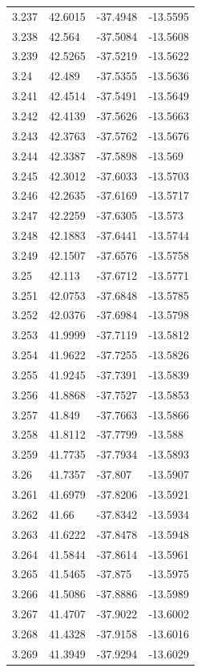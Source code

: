\begin{tabular}{llll}
3.237 & 42.6015 & -37.4948 & -13.5595 \\
3.238 & 42.564 & -37.5084 & -13.5608 \\
3.239 & 42.5265 & -37.5219 & -13.5622 \\
3.24 & 42.489 & -37.5355 & -13.5636 \\
3.241 & 42.4514 & -37.5491 & -13.5649 \\
3.242 & 42.4139 & -37.5626 & -13.5663 \\
3.243 & 42.3763 & -37.5762 & -13.5676 \\
3.244 & 42.3387 & -37.5898 & -13.569 \\
3.245 & 42.3012 & -37.6033 & -13.5703 \\
3.246 & 42.2635 & -37.6169 & -13.5717 \\
3.247 & 42.2259 & -37.6305 & -13.573 \\
3.248 & 42.1883 & -37.6441 & -13.5744 \\
3.249 & 42.1507 & -37.6576 & -13.5758 \\
3.25 & 42.113 & -37.6712 & -13.5771 \\
3.251 & 42.0753 & -37.6848 & -13.5785 \\
3.252 & 42.0376 & -37.6984 & -13.5798 \\
3.253 & 41.9999 & -37.7119 & -13.5812 \\
3.254 & 41.9622 & -37.7255 & -13.5826 \\
3.255 & 41.9245 & -37.7391 & -13.5839 \\
3.256 & 41.8868 & -37.7527 & -13.5853 \\
3.257 & 41.849 & -37.7663 & -13.5866 \\
3.258 & 41.8112 & -37.7799 & -13.588 \\
3.259 & 41.7735 & -37.7934 & -13.5893 \\
3.26 & 41.7357 & -37.807 & -13.5907 \\
3.261 & 41.6979 & -37.8206 & -13.5921 \\
3.262 & 41.66 & -37.8342 & -13.5934 \\
3.263 & 41.6222 & -37.8478 & -13.5948 \\
3.264 & 41.5844 & -37.8614 & -13.5961 \\
3.265 & 41.5465 & -37.875 & -13.5975 \\
3.266 & 41.5086 & -37.8886 & -13.5989 \\
3.267 & 41.4707 & -37.9022 & -13.6002 \\
3.268 & 41.4328 & -37.9158 & -13.6016 \\
3.269 & 41.3949 & -37.9294 & -13.6029 \\

\end{tabular}
